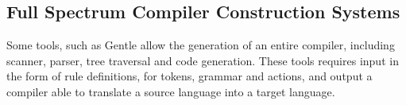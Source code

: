   \subsection{Full Spectrum Compiler Construction Systems}
  
    Some tools, such as Gentle \cite{gentlehome} allow the generation of an entire compiler, including
    scanner, parser, tree traversal and code generation. These tools requires input in the form of
    rule definitions, for tokens, grammar and actions, and output a compiler able to translate a source
    language into a target language.
    
\begin{comment}
  \subsection{Pros and Cons of Automation}

	For languages with a large amount of token and grammar rules, using automated tools, can save
	a lot of time compared to creating the tools by hand. Making adjustments in the language which
	require a restructuring of for example the parser, is less of an issue when a tool is able to
	generate a new one without much work being done.
	
	For a small language however, crafting a compiler by hand can be faster, since you do not have
	to learn the format of the input the tools need to work. Additionally, when hand-crafting a compiler
	it is possible do custom optimizations, like for example creating the parser from e human-readable
	grammar, instead of having to create grammar rules specifically to optimize the output of the tool.
\end{comment}
    
